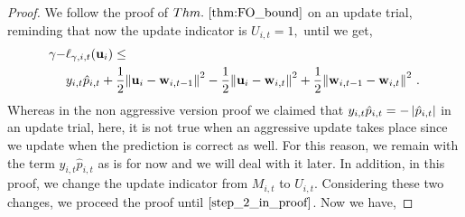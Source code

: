 \begin{proof}
We follow the proof of $\sthmref{thm:FO_bound}$ on an update trial, reminding that now the update indicator is  $U_{i,t}=1, $ until we get,  
\begin{align*}
\gamma-&\ell_{\gamma,i,t}(\mathbf{u}_i)\le \\
&y_{i,t}\hat{p}_{i,t}+\frac{1}{2}{\left\Vert {\mathbf{u}_{i}-\mathbf{w}_{i,t-1}} \right\Vert^2}
        -\frac{1}{2}{\left\Vert {\mathbf{u}_i-\mathbf{w}_{i,t}} \right\Vert^2}+\frac{1}{2}{\left\Vert {\mathbf{w}_{i,t-1}-\mathbf{w}_{i,t}} \right\Vert^2}~.
\end{align*}
Whereas in the non aggressive version proof we claimed that $y_{i,t}\hat{p}_{i,t}=-\left\vert{\hat{p}_{i,t}}\right\vert$ in an update trial, here, it is not true when an aggressive update takes place since we update when the prediction is correct as well. For this reason, we  remain with the term $y_{i,t}\hat{p}_{i,t}$ as is for now and we will deal with it later. In addition, in this proof,  we change the update indicator from $M_{i,t}$ to $U_{i,t}$. Considering these two changes, we proceed the proof until $\eqref{step_2_in_proof}$. Now we have,



\end{proof}
